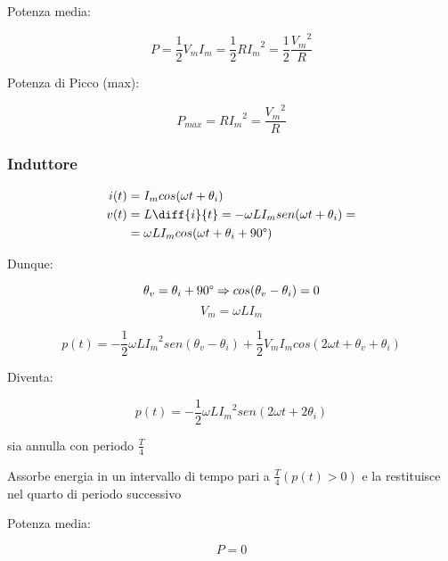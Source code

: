 \documentclass[12pt,titlepage,a4paper]{book}
\begin{document}
Potenza media:

\begin{equation*}
  P = \frac{1}{2} V_m I_m = \frac{1}{2} R {I_m}^2 = \frac{1}{2} \frac{{V_m}^2}{R}
\end{equation*}

Potenza di Picco (max):

\begin{equation*}
  P_{max} = R {I_m}^2 = \frac{{V_m}^2}{R}
\end{equation*}

\subsubsection{Induttore}


\begin{equation*}
  \begin{split}
    i(t) &= I_m cos(\omega t + \theta_i) \\
    v(t) &= L \diff{i}{t} = - \omega L I_m sen(\omega t + \theta_i) = \\
    &= \omega L I_m cos(\omega t + \theta_i + 90\degree)
  \end{split}
\end{equation*}


Dunque:

$$\theta_v = \theta_i + 90\degree \Rightarrow cos(\theta_v - \theta_i) = 0$$
$$ V_m = \omega L I_m $$

\begin{equation*}
  p(t) = - \frac{1}{2} \omega L {I_m}^2 sen(\theta_v - \theta_i) + \frac{1}{2}V_mI_mcos(2 \omega t + \theta_v + \theta_i)
\end{equation*}

Diventa:

\begin{equation*}
  p(t) = - \frac{1}{2} \omega L {I_m}^2 sen(2 \omega t + 2 \theta_i)
\end{equation*}

\begin{list}{-}{La potenza istantanea}
  \item sia annulla con periodo $ \frac{T}{4}$
  \item Assorbe energia in un intervallo di tempo pari a $\frac{T}{4} (p(t) > 0)$ e
        la restituisce nel quarto di periodo successivo
\end{list}

Potenza media:

\begin{equation*}
  P = 0
\end{equation*}
\end{document}
